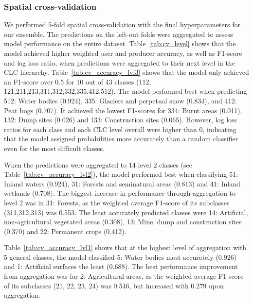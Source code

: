     \subsubsection*{Spatial cross-validation}
        
        We performed 5-fold spatial cross-validation with the final hyperparameters for our ensemble. The predictions on the left-out folds were aggregated to assess model performance on the entire dataset. Table\@~\ref{tab:cv_level} shows that the model achieved higher weighted user and producer accuracy, as well as F1-score and log loss ratio, when predictions were aggregated to their next level in the CLC hierarchy. Table\@~\ref{tab:cv_accuracy_lvl3} shows that the model only achieved an F1-score over 0.5 for 10 out of 43 classes (112, 121,211,213,311,312,332,335,412,512). The model performed best when predicting 512: Water bodies (0.924), 335: Glaciers and perpetual snow (0.834), and 412: Peat bogs (0.707). It achieved the lowest F1-scores for 334: Burnt areas (0.011), 132: Dump sites (0.026) and 133: Construction sites (0.065). However, log loss ratios for each class and each CLC level overall were higher than 0, indicating that the model assigned probabilities more accurately than a random classifier even for the most difficult classes.
        
        When the predictions were aggregated to 14 level 2 classes (see Table\@~\ref{tab:cv_accuracy_lvl2}), the model performed best when classifying 51: Inland waters (0.924), 31: Forests and seminatural areas (0.813) and 41: Inland wetlands (0.708). The biggest increase in performance through aggregation to level 2 was in 31: Forests, as the weighted average F1-score of its subclasses (311,312,313) was 0.553. The least accurately predicted classes were 14: Artificial, non-agricultural vegetated areas (0.308), 13: Mine, dump and construction sites (0.370) and 22: Permanent crops (0.412).
    
        Table\@~\ref{tab:cv_accuracy_lvl1} shows that at the highest level of aggregation with 5 general classes, the model classified 5: Water bodies most accurately (0.926) and 1: Artificial surfaces the least (0.688). The best performance improvement from aggregation was for 2: Agricultural areas, as the weighted average F1-score of its subclasses (21, 22, 23, 24) was 0.546, but increased with 0.279 upon aggregation.

